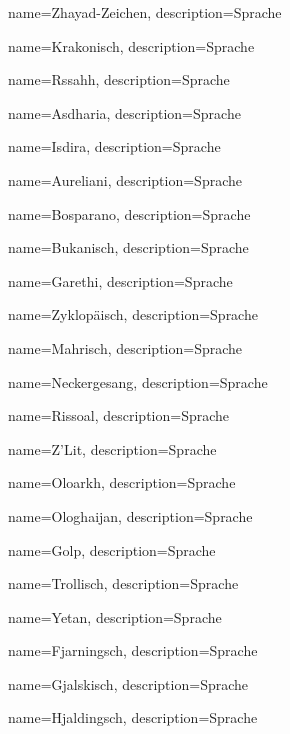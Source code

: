{
    name={Zhayad-Zeichen},
    description={Sprache}
}


{
    name={Krakonisch},
    description={Sprache}
}


{
    name={Rssahh},
    description={Sprache}
}


{
    name={Asdharia},
    description={Sprache}
}


{
    name={Isdira},
    description={Sprache}
}


{
    name={Aureliani},
    description={Sprache}
}


{
    name={Bosparano},
    description={Sprache}
}


{
    name={Bukanisch},
    description={Sprache}
}


{
    name={Garethi},
    description={Sprache}
}


{
    name={Zyklopäisch},
    description={Sprache}
}


{
    name={Mahrisch},
    description={Sprache}
}


{
    name={Neckergesang},
    description={Sprache}
}


{
    name={Rissoal},
    description={Sprache}
}


{
    name={Z’Lit},
    description={Sprache}
}


{
    name={Oloarkh},
    description={Sprache}
}


{
    name={Ologhaijan},
    description={Sprache}
}


{
    name={Golp},
    description={Sprache}
}


{
    name={Trollisch},
    description={Sprache}
}


{
    name={Yetan},
    description={Sprache}
}


{
    name={Fjarningsch},
    description={Sprache}
}


{
    name={Gjalskisch},
    description={Sprache}
}


{
    name={Hjaldingsch},
    description={Sprache}
}


